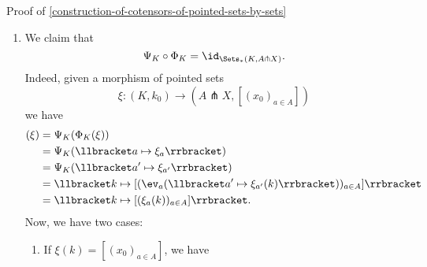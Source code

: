 \begin{Proof}{Proof of \cref{construction-of-cotensors-of-pointed-sets-by-sets}}
\begin{enumerate}
\begin{webcompile}
            \end{webcompile}
            to the morphism of pointed sets
            \[
                \xi^{\dagger}%
                \colon%
                (K,k_{0})%
                \to%
                (A\pitchfork X,[(x_{0})_{a\in A}])%
            \]%
            defined by
            \[
                \xi^{\dagger}(k)%
                \defeq%
                [(\xi_{a}(k))_{a\in A}]%
            \]%
            for each $k\in K$. Note that $\xi^{\dagger}$ is indeed a morphism of pointed sets, as we have
            \begin{align*}
                \xi^{\dagger}(k_{0}) &\defeq [(\xi_{a}(k_{0}))_{a\in A}]\\%
                                     &=      x_{0},
            \end{align*}
            where we have used that $\xi_{a}\in\Sets_{*}(K,X)$ is a morphism of pointed sets for each $a\in A$.
        \item\label{proof-of-construction-of-cotensors-of-pointed-sets-by-sets-3}We claim that
            \[
                \Psi_{K}\circ\Phi_{K}%
                =%
                \id_{\Sets_{*}(K,A\pitchfork X)}.%
            \]%
            Indeed, given a morphism of pointed sets
            \[
                \xi%
                \colon%
                (K,k_{0})%
                \to%
                (A\pitchfork X,[(x_{0})_{a\in A}])%
            \]%
            we have
            \begin{align*}
                [\Psi_{K}\circ\Phi_{K}](\xi) &= \Psi_{K}(\Phi_{K}(\xi))\\%
                                             &= \Psi_{K}(\llbracket a\mapsto\xi_{a}\rrbracket)\\%
                                             &= \Psi_{K}(\llbracket a'\mapsto\xi_{a'}\rrbracket)\\%
                                             &= \llbracket k\mapsto[(\ev_{a}(\llbracket a'\mapsto\xi_{a'}(k)\rrbracket))_{a\in A}]\rrbracket\\%
                                             &= \llbracket k\mapsto[(\xi_{a}(k))_{a\in A}]\rrbracket.%
            \end{align*}
            Now, we have two cases:
            \begin{enumerate}
                \item\label{proof-of-construction-of-cotensors-of-pointed-sets-by-sets-3a}If $\xi(k)=[(x_{0})_{a\in A}]$, we have

\end{enumerate}
\end{enumerate}
\end{Proof}
